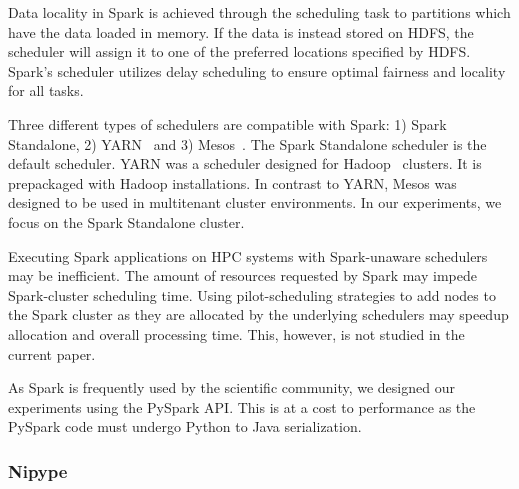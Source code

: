 \documentclass{IEEEtran}
\begin{document}
Data locality in Spark is achieved through the  scheduling task to partitions which have the
data loaded in memory. If the data is instead stored on HDFS, the scheduler will
assign it to one of the preferred locations specified by HDFS. Spark's scheduler
utilizes delay scheduling to ensure optimal fairness and locality for all tasks.

Three different types of schedulers are compatible with Spark: 1) Spark 
Standalone, 2) YARN~\cite{yarn} and 3) Mesos~\cite{mesos}. The Spark Standalone
scheduler is the default scheduler. YARN was a scheduler designed for Hadoop~\cite{hadoop}
clusters. It is prepackaged with Hadoop installations. In contrast to YARN, 
Mesos was designed to be used in multitenant cluster environments. In our experiments,
we focus on the Spark Standalone cluster.

Executing Spark applications on HPC systems with Spark-unaware schedulers may
be inefficient. The amount of resources requested by Spark may impede Spark-cluster
scheduling time. Using pilot-scheduling strategies to add nodes to the Spark cluster
as they are allocated by the underlying schedulers may speedup allocation and 
overall processing time. This, however, is not studied in the current paper.

As Spark is frequently used by the scientific community, we designed our 
experiments using the PySpark API. This is at a cost to performance as the PySpark
code must undergo Python to Java serialization.




\subsubsection{Nipype}
\end{document}
